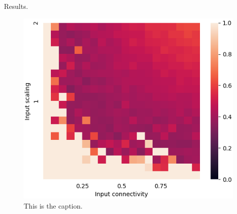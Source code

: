 Results.

\begin{figure}[H]
  \centering
  \includegraphics[scale = 0.4]{img/input_scaling_input_connectivity_heatmap.png}
  \caption{This is the caption.}
  \label{fig:isicheatpmap}
\end{figure}


